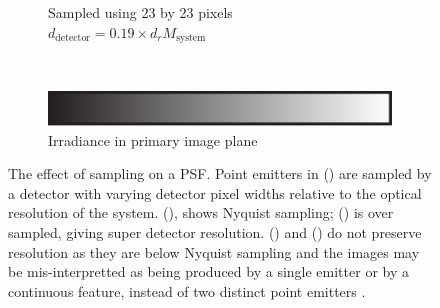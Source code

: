 \begin{figure}
\begin{subfigure}[t]{0.4\textwidth}
        \caption{Sampled using 23 by 23 pixels\\
        \(d_{\text{detector}} = 0.19 \times d_{r}M_{\text{system}}\)}\label{fig:digital_airy_sample_23}
    \end{subfigure}\\
    \begin{subfigure}[t]{\textwidth}
      \vspace{\abovecaptionskip}
      \centering
      \includegraphics{./sampling/colourbar}\\
      Irradiance in primary image plane
    \end{subfigure}
    \caption[The effect of sampling on a \gls{PSF}]{The effect of sampling on a \gls{PSF}.
    Point emitters in () are sampled by a detector with varying detector pixel widths relative to the optical resolution of the system.
    (), shows Nyquist sampling;
    () is over sampled, giving super detector resolution.
    () and () do not preserve resolution as they are below Nyquist sampling and the images may be mis-interpretted as being produced by a single emitter or by a continuous feature, instead of two distinct point emitters%
    .}\label{fig:digital_airy}
\end{figure}
\pagebreak

%


